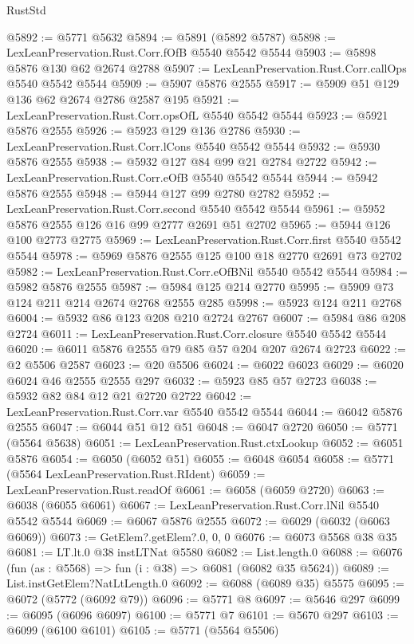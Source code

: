 \begin{lexlean}{RustStd}
\begin{coremodule}
@5892 := @5771 @5632
@5894 := @5891 (@5892 @5787)
@5898 := LexLeanPreservation.Rust.Corr.fOfB @5540 @5542 @5544
@5903 := @5898 @5876 @130 @62 @2674 @2788
@5907 := LexLeanPreservation.Rust.Corr.callOps @5540 @5542 @5544
@5909 := @5907 @5876 @2555
@5917 := @5909 @51 @129 @136 @62 @2674 @2786 @2587 @195
@5921 := LexLeanPreservation.Rust.Corr.opsOfL @5540 @5542 @5544
@5923 := @5921 @5876 @2555
@5926 := @5923 @129 @136 @2786
@5930 := LexLeanPreservation.Rust.Corr.lCons @5540 @5542 @5544
@5932 := @5930 @5876 @2555
@5938 := @5932 @127 @84 @99 @21 @2784 @2722
@5942 := LexLeanPreservation.Rust.Corr.eOfB @5540 @5542 @5544
@5944 := @5942 @5876 @2555
@5948 := @5944 @127 @99 @2780 @2782
@5952 := LexLeanPreservation.Rust.Corr.second @5540 @5542 @5544
@5961 := @5952 @5876 @2555 @126 @16 @99 @2777 @2691 @51 @2702
@5965 := @5944 @126 @100 @2773 @2775
@5969 := LexLeanPreservation.Rust.Corr.first @5540 @5542 @5544
@5978 := @5969 @5876 @2555 @125 @100 @18 @2770 @2691 @73 @2702
@5982 := LexLeanPreservation.Rust.Corr.eOfBNil @5540 @5542 @5544
@5984 := @5982 @5876 @2555
@5987 := @5984 @125 @214 @2770
@5995 := @5909 @73 @124 @211 @214 @2674 @2768 @2555 @285
@5998 := @5923 @124 @211 @2768
@6004 := @5932 @86 @123 @208 @210 @2724 @2767
@6007 := @5984 @86 @208 @2724
@6011 := LexLeanPreservation.Rust.Corr.closure @5540 @5542 @5544
@6020 := @6011 @5876 @2555 @79 @85 @57 @204 @207 @2674 @2723
@6022 := @2 @5506 @2587
@6023 := @20 @5506
@6024 := @6022 @6023
@6029 := @6020 @6024 @46 @2555 @2555 @297
@6032 := @5923 @85 @57 @2723
@6038 := @5932 @82 @84 @12 @21 @2720 @2722
@6042 := LexLeanPreservation.Rust.Corr.var @5540 @5542 @5544
@6044 := @6042 @5876 @2555
@6047 := @6044 @51 @12 @51
@6048 := @6047 @2720
@6050 := @5771 (@5564 @5638)
@6051 := LexLeanPreservation.Rust.ctxLookup
@6052 := @6051 @5876
@6054 := @6050 (@6052 @51)
@6055 := @6048 @6054
@6058 := @5771 (@5564 LexLeanPreservation.Rust.RIdent)
@6059 := LexLeanPreservation.Rust.readOf
@6061 := @6058 (@6059 @2720)
@6063 := @6038 (@6055 @6061)
@6067 := LexLeanPreservation.Rust.Corr.lNil @5540 @5542 @5544
@6069 := @6067 @5876 @2555
@6072 := @6029 (@6032 (@6063 @6069))
@6073 := GetElem?.getElem?.{0, 0, 0}
@6076 := @6073 @5568 @38 @35
@6081 := LT.lt.{0} @38 instLTNat @5580
@6082 := List.length.{0}
@6088 := @6076 (fun (as : @5568) => fun (i : @38) => @6081 (@6082 @35 @5624))
@6089 := List.instGetElem?NatLtLength.{0}
@6092 := @6088 (@6089 @35) @5575
@6095 := @6072 (@5772 (@6092 @79))
@6096 := @5771 @8
@6097 := @5646 @297
@6099 := @6095 (@6096 @6097)
@6100 := @5771 @7
@6101 := @5670 @297
@6103 := @6099 (@6100 @6101)
@6105 := @5771 (@5564 @5506)

\end{coremodule}
\end{lexlean}

